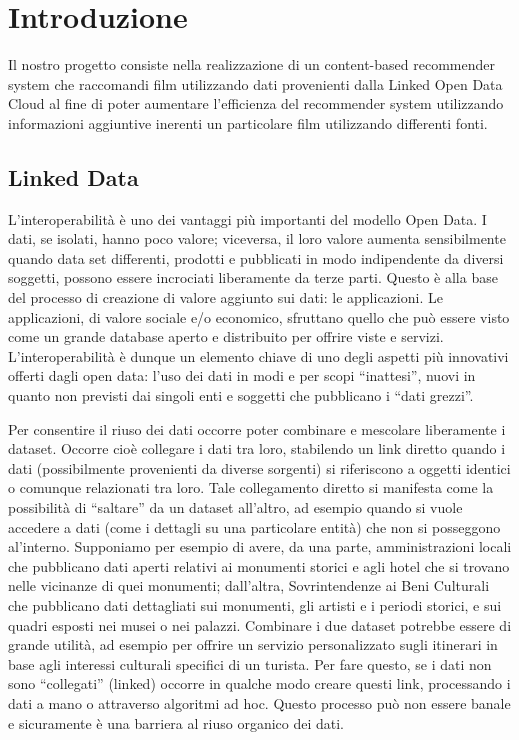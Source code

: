 \section{Introduzione}
Il nostro progetto consiste nella realizzazione di un content-based recommender system che raccomandi film utilizzando dati provenienti dalla Linked Open Data Cloud al fine di poter aumentare l'efficienza del recommender system utilizzando informazioni aggiuntive inerenti un particolare film utilizzando differenti fonti.

\subsection{Linked Data}
L’interoperabilità è uno dei vantaggi più importanti del modello Open Data. I dati, se isolati, hanno poco valore; viceversa, il loro valore aumenta sensibilmente quando data set differenti, prodotti e pubblicati in modo indipendente da diversi soggetti, possono essere incrociati liberamente da terze parti. Questo è alla base del processo di creazione di valore aggiunto sui dati: le applicazioni. Le applicazioni, di valore sociale e/o economico, sfruttano quello che può essere visto come un grande database aperto e distribuito per offrire viste e servizi. L’interoperabilità è dunque un elemento chiave di uno degli aspetti più innovativi offerti dagli open data: l’uso dei dati in modi e per scopi “inattesi”, nuovi in quanto non previsti dai singoli enti e soggetti che pubblicano i “dati grezzi”.

Per consentire il riuso dei dati occorre poter combinare e mescolare liberamente i dataset. Occorre cioè collegare i dati tra loro, stabilendo un link diretto quando i dati (possibilmente provenienti da diverse sorgenti) si riferiscono a oggetti identici o comunque relazionati tra loro. Tale collegamento diretto si manifesta come la possibilità di “saltare” da un dataset all’altro, ad esempio quando si vuole accedere a dati (come i dettagli su una particolare entità) che non si posseggono al’interno.
Supponiamo per esempio di avere, da una parte, amministrazioni locali che pubblicano dati aperti relativi ai monumenti storici e agli hotel che si trovano nelle vicinanze di quei monumenti; dall’altra, Sovrintendenze ai Beni Culturali che pubblicano dati dettagliati sui monumenti, gli artisti e i periodi storici, e sui quadri esposti nei musei o nei palazzi.
Combinare i due dataset potrebbe essere di grande utilità, ad esempio per offrire un servizio personalizzato sugli itinerari in base agli interessi culturali specifici di un turista.
Per fare questo, se i dati non sono “collegati” (linked) occorre in qualche modo creare questi link, processando i dati a mano o attraverso algoritmi ad hoc. Questo processo può non essere banale e sicuramente è una barriera al riuso organico dei dati.

